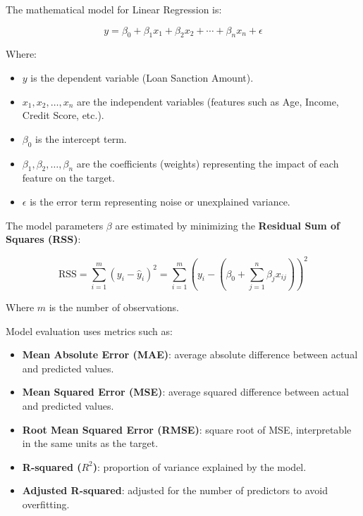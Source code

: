 \documentclass{article}
\begin{document}
The mathematical model for Linear Regression is:

\begin{equation}
    y = \beta_0 + \beta_1 x_1 + \beta_2 x_2 + \cdots + \beta_n x_n + \epsilon
\end{equation}

Where:

\begin{itemize}
    \item $y$ is the dependent variable (Loan Sanction Amount).
    \item $x_1, x_2, \ldots, x_n$ are the independent variables (features such as Age, Income, Credit Score, etc.).
    \item $\beta_0$ is the intercept term.
    \item $\beta_1, \beta_2, \ldots, \beta_n$ are the coefficients (weights) representing the impact of each feature on the target.
    \item $\epsilon$ is the error term representing noise or unexplained variance.
\end{itemize}

The model parameters $\beta$ are estimated by minimizing the \textbf{Residual Sum of Squares (RSS)}:

\begin{equation}
    \text{RSS} = \sum_{i=1}^{m} (y_i - \hat{y}_i)^2 = \sum_{i=1}^{m} \left( y_i - \left( \beta_0 + \sum_{j=1}^{n} \beta_j x_{ij} \right) \right)^2
\end{equation}

Where $m$ is the number of observations.

Model evaluation uses metrics such as:

\begin{itemize}
    \item \textbf{Mean Absolute Error (MAE)}: average absolute difference between actual and predicted values.
    \item \textbf{Mean Squared Error (MSE)}: average squared difference between actual and predicted values.
    \item \textbf{Root Mean Squared Error (RMSE)}: square root of MSE, interpretable in the same units as the target.
    \item \textbf{R-squared ($R^2$)}: proportion of variance explained by the model.
    \item \textbf{Adjusted R-squared}: adjusted for the number of predictors to avoid overfitting.
\end{itemize}
\end{document}
